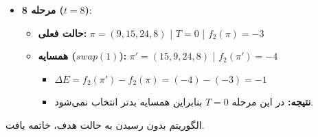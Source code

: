 \begin{ابجد}
\begin{itemize}
          \vspace{0.7cm}

    \item \textbf{مرحله 8 ($t=8$)}:
          \begin{itemize}
              \item \textbf{حالت فعلی:} $\pi = (9, 15, 24, 8)$ | $T = 0$ | $f_2(\pi) = -3$
              \item \textbf{همسایه ($swap(1)$):} $\pi' = (15, 9, 24, 8)$ | $f_2(\pi') = -4$
                    \begin{itemize}
                        \item $\Delta E = f_2(\pi') - f_2(\pi) = (-4) - (-3) = -1$
                        \item \textbf{نتیجه:} در این مرحله $T=0$ بنابراین همسایه بدتر انتخاب نمی‌شود.
                    \end{itemize}
          \end{itemize}

          \vspace{0.7cm}
\end{itemize}

الگوریتم بدون رسیدن به حالت هدف، خاتمه یافت.

\end{ابجد}